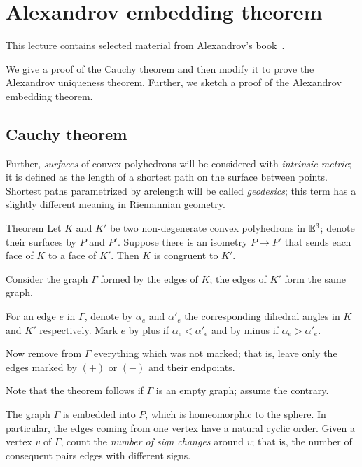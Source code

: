 \chapter{Alexandrov embedding theorem}

This lecture contains selected material from Alexandrov's book~\cite{alexandrov}.

We give a proof of the Cauchy theorem and then modify it to prove the Alexandrov uniqueness theorem.
Further, we sketch a proof of the Alexandrov embedding theorem.


\section{Cauchy theorem}

Further, \textit{surfaces} of convex polyhedrons will be considered with \emph{intrinsic metric}; it is defined as the length of a shortest path on the surface between points.
Shortest paths parametrized by arclength will be called \emph{geodesics}; 
this term has a slightly different meaning in Riemannian geometry.
 
\begin{thm}{Theorem}\label{thm:cauchy} Let $K$ and $K'$ be two non-degenerate convex polyhedrons in $\mathbb{E}^3$;
denote their surfaces 
by $P$ and $P'$.
Suppose there is an isometry $P\to P'$ that sends each face of $K$ to a face of $K'$.
Then $K$ is congruent to $K'$.
\end{thm}

Consider the graph $\Gamma$ formed by the edges of $K$;
the edges of $K'$ form the same graph.
 
For an edge $e$ in $\Gamma$, denote by $\alpha_e$ and $\alpha'_e$ the corresponding dihedral angles in $K$ and $K'$ respectively.
Mark $e$ by plus if $\alpha_e < \alpha'_e$ and by minus if $\alpha_e > \alpha'_e$.

Now remove from $\Gamma$ everything which was not marked;
that is, leave only the edges marked by $(+)$ or $(-)$ and their endpoints.

Note that the theorem follows if $\Gamma$ is an empty graph;
assume the contrary.

The graph $\Gamma$ is embedded into $P$, which is homeomorphic to the sphere.
In particular, the edges coming from one vertex have a natural cyclic order. 
Given a vertex $v$ of $\Gamma$, count the \textit{number of sign changes} around $v$;
that is, the number of consequent pairs edges with different signs. 

